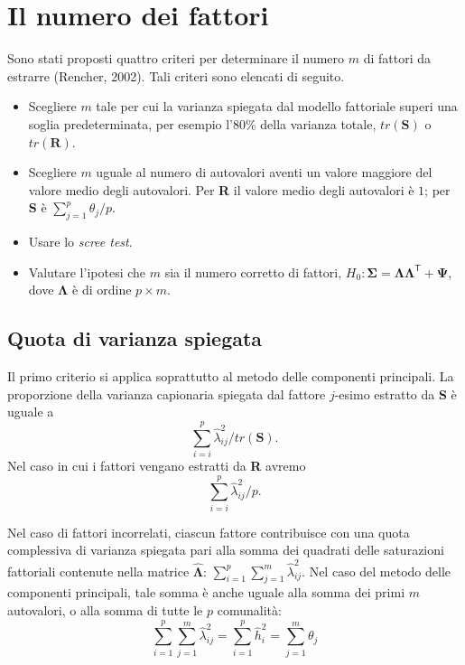 

\chapter{Il numero dei fattori}
\label{ch:numero_fattori}

Sono stati proposti quattro criteri per determinare il numero $m$ di
fattori da estrarre (Rencher, 2002).  
Tali criteri sono elencati di seguito.

\begin{itemize}
\item Scegliere $m$ tale per cui la varianza spiegata dal modello
  fattoriale superi una soglia predeterminata, per esempio l'80\%
  della varianza totale, $tr(\textbf{S})$ o $tr(\textbf{R})$. 
\item Scegliere $m$ uguale al numero di autovalori aventi un valore maggiore del valore medio degli autovalori.  Per \textbf{R} il valore medio degli
  autovalori è $1$; per \textbf{S} è $\sum_{j=1}^p \theta_j/p$. 
\item Usare lo {\it scree test}.
\item Valutare l'ipotesi che $m$ sia il numero corretto di fattori,
  $H_0: \boldsymbol{\Sigma} =  \boldsymbol{\Lambda}
  \boldsymbol{\Lambda}^{\ensuremath{\mathsf{T}}} +  \boldsymbol{\Psi}$, dove $\boldsymbol{\Lambda}$ è di ordine $p \times m$.
\end{itemize}

\section{Quota di varianza spiegata}

Il primo criterio si applica soprattutto al metodo  delle
componenti principali. La proporzione della varianza capionaria spiegata
dal fattore $j$-esimo estratto da \textbf{S} è uguale a
\begin{equation}
\sum_{i=i}^p \hat{\lambda}_{ij}^2 / tr(\textbf{S}).
\end{equation}
Nel caso in cui i fattori vengano estratti da \textbf{R} avremo
\begin{equation}
\sum_{i=i}^p \hat{\lambda}_{ij}^2 / p.
\end{equation}

Nel caso di fattori incorrelati, ciascun fattore contribuisce con una quota complessiva
di varianza spiegata pari alla somma dei quadrati delle saturazioni
fattoriali contenute nella matrice $\hat{\boldsymbol{\Lambda}}$:
$\sum_{i=1}^p\sum_{j=1}^m\hat{\lambda}_{ij}^2$.  Nel caso del metodo
delle componenti principali, tale somma è anche uguale alla somma dei
primi $m$ autovalori, o alla somma di tutte le $p$ comunalità:
\begin{equation}
\sum_{i=1}^p\sum_{j=1}^m\hat{\lambda}_{ij}^2= \sum_{i=1}^p \hat{h}_i^2
= \sum_{j=1}^m \theta_j
\end{equation}


